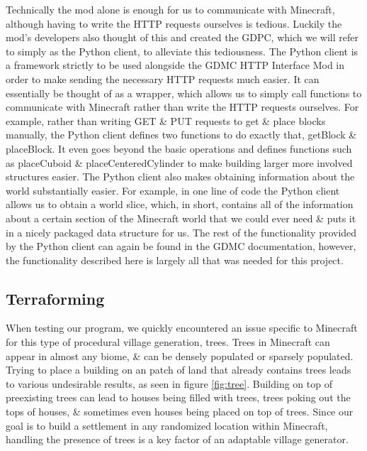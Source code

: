 \documentclass[11pt, oneside]{article}
\begin{document}
\begin{normalsize}
Technically the mod alone is enough for us to communicate with Minecraft, although having to write the HTTP requests ourselves is tedious. 
Luckily the mod's developers also thought of this and created the GDPC, which we will refer to simply as the Python client, to alleviate this tediousness. 
The Python client is a framework strictly to be used alongside the GDMC HTTP Interface Mod in order to make sending the necessary HTTP requests much easier. 
It can essentially be thought of as a wrapper, which allows us to simply call functions to communicate with Minecraft rather than write the HTTP requests ourselves. 
For example, rather than writing GET \& PUT requests to get \& place blocks manually, the Python client defines two functions to do exactly that, getBlock \& placeBlock. 
It even goes beyond the basic operations and defines functions such as placeCuboid \& placeCenteredCylinder to make building larger more involved structures easier. 
The Python client also makes obtaining information about the world substantially easier. 
For example, in one line of code the Python client allows us to obtain a world slice, which, in short, contains all of the information about a certain section of the Minecraft world that we could ever need \& puts it in a nicely packaged data structure for us. 
The rest of the functionality provided by the Python client can again be found in the GDMC documentation, however, the functionality described here is largely all that was needed for this project. 


\subsection{Terraforming}

When testing our program, we quickly encountered an issue specific to Minecraft for this type of procedural village generation, trees. Trees in Minecraft can appear in almost any biome, \& can be densely populated or sparsely populated. Trying to place a building on an patch of land that already contains trees leads to various undesirable results, as seen in figure \ref{fig:tree}. Building on top of preexisting trees can lead to houses being filled with trees, trees poking out the tops of houses, \& sometimes even houses being placed on top of trees. Since our goal is to build a settlement in any randomized location within Minecraft, handling the presence of trees is a key factor of an adaptable village generator.


\end{normalsize}
\end{document}
